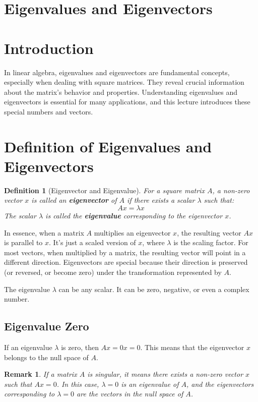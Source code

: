 \documentclass{article}
\newtheorem{definition}{Definition}
\newtheorem{remark}{Remark}
\begin{document}
\sloppy

\section{Eigenvalues and Eigenvectors}

\section{Introduction}

In linear algebra, eigenvalues and eigenvectors are fundamental concepts, especially when dealing with square matrices. They reveal crucial information about the matrix's behavior and properties.  Understanding eigenvalues and eigenvectors is essential for many applications, and this lecture introduces these special numbers and vectors.

\section{Definition of Eigenvalues and Eigenvectors}

\begin{definition}[Eigenvector and Eigenvalue]
For a square matrix $A$, a non-zero vector $x$ is called an \textbf{eigenvector} of $A$ if there exists a scalar $\lambda$ such that:
\[Ax = \lambda x\]
The scalar $\lambda$ is called the \textbf{eigenvalue} corresponding to the eigenvector $x$.
\end{definition}

In essence, when a matrix $A$ multiplies an eigenvector $x$, the resulting vector $Ax$ is parallel to $x$. It's just a scaled version of $x$, where $\lambda$ is the scaling factor. For most vectors, when multiplied by a matrix, the resulting vector will point in a different direction. Eigenvectors are special because their direction is preserved (or reversed, or become zero) under the transformation represented by $A$.

The eigenvalue $\lambda$ can be any scalar. It can be zero, negative, or even a complex number.

\subsection{Eigenvalue Zero}
If an eigenvalue $\lambda$ is zero, then $Ax = 0x = 0$. This means that the eigenvector $x$ belongs to the null space of $A$.
\begin{remark}
If a matrix $A$ is singular, it means there exists a non-zero vector $x$ such that $Ax=0$. In this case, $\lambda = 0$ is an eigenvalue of $A$, and the eigenvectors corresponding to $\lambda = 0$ are the vectors in the null space of $A$.
\end{remark}
\end{document}
